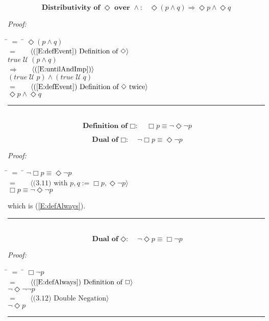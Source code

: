 \documentclass[fleqn, leqno]{article}
\newcommand{\lgap}{2pt}                             %
\newcommand{\mymathindent}{24pt}                      %
\newcommand{\until}{\;\mathcal{U}\;}
\newcommand{\event}{\Diamond}
\newcommand{\always}{\Box}
\newcommand{\myqed}{\hfill\rule[-.23ex]{1.2ex}{2.0ex}}
\newcommand{\Gll} {\langle}                         %
\newcommand{\Ggg} {\rangle}                         %
\newcommand{\Hint}[1]     {\ \ \ $\Gll              \mbox{#1} \Ggg$ }   %
\begin{document}
\begin{equation}\label{E:distEventAnd}
\textbf{Distributivity of $\event$ over $\land$:}\quad \event(p \land q) \Rightarrow \event p \land \event q
\end{equation}

\emph{Proof:}
\begin{tabbing}
\hspace{\mymathindent} \= $= \;$ \= \kill
  \> \>   $\event(p \land q)$\\[\lgap]
  \> $=$  \>  \Hint{(\ref{E:defEvent}) Definition of $\event$}\\[\lgap]
  \> \>   $true \until (p \land q)$\\[\lgap]
  \> $\Rightarrow$  \>  \Hint{(\ref{E:untilAndImp})}\\[\lgap]
  \> \>   $(true \until p) \land (true \until q)$\\[\lgap]
  \> $=$  \>  \Hint{(\ref{E:defEvent}) Definition of $\event$ twice}\\[\lgap]
  \> \>   $\event p \land \event q$\\[\lgap]
\end{tabbing}
\myqed\\[\lgap]


\begin{equation}\label{E:defAlways}
\textbf{Definition of $\always$:}\quad \always p \equiv \lnot\event\lnot p
\end{equation}

\begin{equation}\label{E:dualAlways}
\textbf{Dual of $\always$:}\quad \lnot\always p \equiv \event\lnot p
\end{equation}

\emph{Proof:}
\begin{tabbing}
\hspace{\mymathindent} \= $= \;$ \= \kill
  \> \>   $\lnot\always p \equiv \event\lnot p$\\[\lgap]
  \> $=$  \>  \Hint{(3.11) with $p,q := \always p, \event\lnot p$}\\[\lgap]
  \> \>   $\always p \equiv \lnot\event\lnot p$
\end{tabbing}
which is (\ref{E:defAlways}). \myqed\\[\lgap]


\begin{equation}\label{E:dualEvent}
\textbf{Dual of $\event$:}\quad \lnot\event p \equiv \always\lnot p
\end{equation}

\emph{Proof:}
\begin{tabbing}
\hspace{\mymathindent} \= $= \;$ \= \kill
  \> \>   $\always\lnot p$\\[\lgap]
  \> $=$  \>  \Hint{(\ref{E:defAlways}) Definition of $\always$}\\[\lgap]
  \> \>   $\lnot\event\lnot\lnot p$\\[\lgap]
  \> $=$  \>  \Hint{(3.12) Double Negation}\\[\lgap]
  \> \>   $\lnot\event p$\\[\lgap]
\end{tabbing}
\myqed\\[\lgap]
\end{document}
